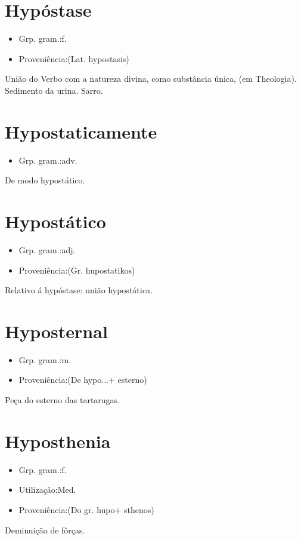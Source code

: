\documentclass{article}
\begin{document}
\section{Hypóstase}
\begin{itemize}
\item {Grp. gram.:f.}
\end{itemize}
\begin{itemize}
\item {Proveniência:(Lat. \textunderscore hypostasis\textunderscore )}
\end{itemize}
União do Verbo com a natureza divina, como substância única, (em Theologia).
Sedimento da urina.
Sarro.
\section{Hypostaticamente}
\begin{itemize}
\item {Grp. gram.:adv.}
\end{itemize}
De modo hypostático.
\section{Hypostático}
\begin{itemize}
\item {Grp. gram.:adj.}
\end{itemize}
\begin{itemize}
\item {Proveniência:(Gr. \textunderscore hupostatikos\textunderscore )}
\end{itemize}
Relativo á hypóstase: \textunderscore união hypostática\textunderscore .
\section{Hyposternal}
\begin{itemize}
\item {Grp. gram.:m.}
\end{itemize}
\begin{itemize}
\item {Proveniência:(De \textunderscore hypo...\textunderscore  + \textunderscore esterno\textunderscore )}
\end{itemize}
Peça do esterno das tartarugas.
\section{Hyposthenia}
\begin{itemize}
\item {Grp. gram.:f.}
\end{itemize}
\begin{itemize}
\item {Utilização:Med.}
\end{itemize}
\begin{itemize}
\item {Proveniência:(Do gr. \textunderscore hupo\textunderscore  + \textunderscore sthenos\textunderscore )}
\end{itemize}
Deminuição de fôrças.
\end{document}
